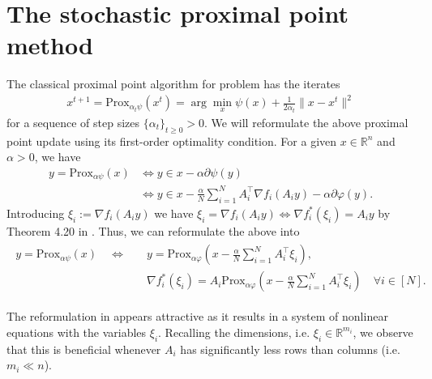 \documentclass[12pt,a4paper,twoside]{article}
\makeatletter
\renewcommand*{\eqref}[1]{%
	\hyperref[{#1}]{\textup{\tagform@{\ref*{#1}}}}%
}
\theoremstyle{plain}
\theoremstyle{note}
\numberwithin{thm}{section}
\newcommand{\trp}[1]{#1^{\intercal}}
\newcommand{\prox}[2]{\text{Prox}_{#1}\left(#2\right)}
\newcommand{\oneover}[1]{\frac{1}{#1}}
\let\temp\phi
\let\phi\varphi
\let\varphi\temp
\makeatother
\begin{document}
	\clearpage
	\section{The stochastic proximal point method}
	The classical proximal point algorithm for problem \eqref{prob:deterministic} has the iterates
	\begin{align*}
		x^{t+1} = \prox{\alpha_t \psi}{x^t} = \arg \min_x \psi(x) + \oneover{2\alpha_t}\|x-x^t\|^2
	\end{align*}
	for a sequence of step sizes $\{\alpha_t\}_{t\geq 0} > 0$.
	We will reformulate the above proximal point update using its first-order optimality condition.
	For a given $x \in \mathbb{R}^n$ and $\alpha > 0$, we have 
	\begin{align*}
	y = \prox{\alpha \psi}{x} &\Longleftrightarrow y \in x - \alpha \partial \psi(y)\\ &\Longleftrightarrow y \in x- \frac{\alpha}{N} \sum_{i=1}^{N} \trp{A}_i\nabla f_i(A_iy)- \alpha \partial\phi(y).
	\end{align*}
	Introducing $\xi_i := \nabla f_i(A_i y)$ we have $\xi_i = \nabla f_i(A_i y) \Longleftrightarrow \nabla f_i^\ast(\xi_i) = A_iy$ by Theorem 4.20 in \cite{Beck2017}. Thus, we can reformulate the above into
	\begin{align}
	\label{eqn:nonlinear_system}
	\begin{split}
	y = \prox{\alpha \psi}{x} \quad \Longleftrightarrow \quad &y = \prox{\alpha \phi}{x - \frac{\alpha}{N} \sum_{i=1}^{N} A_i^\intercal \xi_i}, \\
	&\nabla f_i^\ast(\xi_i) = A_i \prox{\alpha \phi}{x - \frac{\alpha}{N} \sum_{i=1}^{N} A_i^\intercal \xi_i} \quad \forall i \in [N].
	\end{split}
	\end{align}
	\vspace{10mm}
	
	The reformulation in \eqref{eqn:nonlinear_system} appears attractive as it results in a system of nonlinear equations with the variables $\xi_i$. Recalling the dimensions, i.e. $\xi_i \in \mathbb{R}^{m_i}$, we observe that this is beneficial whenever $A_i$ has significantly less rows than columns (i.e. $m_i \ll n$).
	
\end{document}
